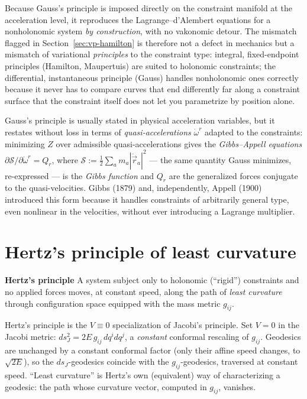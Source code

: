 Because Gauss's principle is imposed directly on the constraint manifold at the
acceleration level, it reproduces the Lagrange--d'Alembert equations for a
nonholonomic system \emph{by construction}, with no vakonomic detour. The
mismatch flagged in Section~\ref{sec:vp-hamilton} is therefore not a defect in
mechanics but a mismatch of variational \emph{principles} to the constraint
type: integral, fixed-endpoint principles (Hamilton, Maupertuis) are suited to
holonomic constraints; the differential, instantaneous principle (Gauss)
handles nonholonomic ones correctly because it never has to compare curves that
end differently far along a constraint surface that the constraint itself does
not let you parametrize by position alone.

Gauss's principle is usually stated in physical acceleration variables, but it
restates without loss in terms of \emph{quasi-accelerations} $\dot\omega^r$
adapted to the constraints: minimizing $Z$ over admissible quasi-accelerations
gives the \emph{Gibbs--Appell equations} $\partial\mathcal
S/\partial\dot\omega^r = Q_r$, where $\mathcal S:=\tfrac12\sum_a m_a|\ddot{\vec
r}_a|^2$ --- the same quantity Gauss minimizes, re-expressed --- is the
\emph{Gibbs function} and $Q_r$ are the generalized forces conjugate to the
quasi-velocities. Gibbs (1879) and, independently, Appell (1900) introduced
this form because it handles constraints of arbitrarily general type, even
nonlinear in the velocities, without ever introducing a Lagrange multiplier.

\section{Hertz's principle of least curvature}
\label{sec:vp-hertz}

\begin{definition}
\textbf{Hertz's principle} A system subject only to holonomic (``rigid'')
    constraints and no applied forces moves, at constant speed, along the path
    of \emph{least curvature} through configuration space equipped with the
    mass metric $g_{ij}$.
\end{definition}

Hertz's principle is the $V\equiv 0$ specialization of Jacobi's principle.
Set $V=0$ in the Jacobi metric: $ds_J^2 = 2E\,g_{ij}\,dq^idq^j$, a
\emph{constant} conformal rescaling of $g_{ij}$. Geodesics are unchanged by a
constant conformal factor (only their affine speed changes, to $\sqrt{2E}$), so
the $ds_J$-geodesics coincide with the $g_{ij}$-geodesics, traversed at
constant speed. ``Least curvature'' is Hertz's own (equivalent) way of
characterizing a geodesic: the path whose curvature vector, computed in
$g_{ij}$, vanishes.

